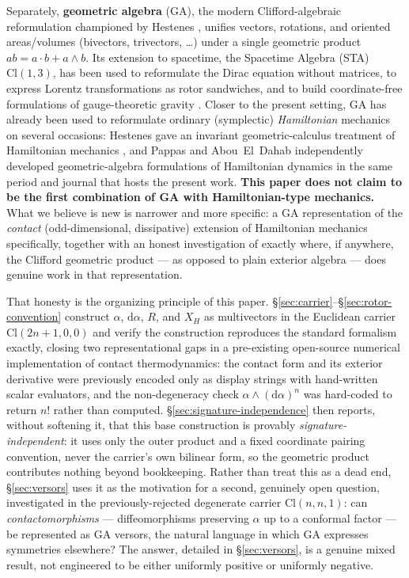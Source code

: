 \documentclass[11pt]{article}
\newcommand{\Cl}{\mathrm{Cl}}
\newcommand{\dif}{\mathrm{d}}
\begin{document}
Separately, \textbf{geometric algebra} (GA), the modern Clifford-algebraic reformulation championed by Hestenes \cite{hestenes2003sta}, unifies vectors, rotations, and oriented areas/volumes (bivectors, trivectors, \dots) under a single geometric product $ab = a\cdot b + a\wedge b$. Its extension to spacetime, the Spacetime Algebra (STA) $\Cl(1,3)$, has been used to reformulate the Dirac equation without matrices, to express Lorentz transformations as rotor sandwiches, and to build coordinate-free formulations of gauge-theoretic gravity \cite{lasenby2016ga,dressel2015sta}. Closer to the present setting, GA has already been used to reformulate ordinary (symplectic) \emph{Hamiltonian} mechanics on several occasions: Hestenes gave an invariant geometric-calculus treatment of Hamiltonian mechanics \cite{hestenes1993hamiltonian}, and Pappas \cite{pappas1993hamiltonian} and Abou~El~Dahab \cite{aboueldahab2000hamiltonian} independently developed geometric-algebra formulations of Hamiltonian dynamics in the same period and journal that hosts the present work. \textbf{This paper does not claim to be the first combination of GA with Hamiltonian-type mechanics.} What we believe is new is narrower and more specific: a GA representation of the \emph{contact} (odd-dimensional, dissipative) extension of Hamiltonian mechanics specifically, together with an honest investigation of exactly where, if anywhere, the Clifford geometric product — as opposed to plain exterior algebra — does genuine work in that representation.

That honesty is the organizing principle of this paper. \S\ref{sec:carrier}--\S\ref{sec:rotor-convention} construct $\alpha$, $\dif\alpha$, $R$, and $X_H$ as multivectors in the Euclidean carrier $\Cl(2n+1,0,0)$ and verify the construction reproduces the standard formalism exactly, closing two representational gaps in a pre-existing open-source numerical implementation of contact thermodynamics: the contact form and its exterior derivative were previously encoded only as display strings with hand-written scalar evaluators, and the non-degeneracy check $\alpha\wedge(\dif\alpha)^n$ was hard-coded to return $n!$ rather than computed. \S\ref{sec:signature-independence} then reports, without softening it, that this base construction is provably \emph{signature-independent}: it uses only the outer product and a fixed coordinate pairing convention, never the carrier's own bilinear form, so the geometric product contributes nothing beyond bookkeeping. Rather than treat this as a dead end, \S\ref{sec:versors} uses it as the motivation for a second, genuinely open question, investigated in the previously-rejected degenerate carrier $\Cl(n,n,1)$: can \emph{contactomorphisms} — diffeomorphisms preserving $\alpha$ up to a conformal factor — be represented as GA versors, the natural language in which GA expresses symmetries elsewhere? The answer, detailed in \S\ref{sec:versors}, is a genuine mixed result, not engineered to be either uniformly positive or uniformly negative.
\end{document}
